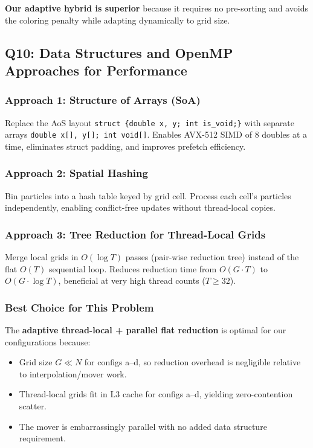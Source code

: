 \documentclass[12pt,a4paper]{article}
\begin{document}
\textbf{Our adaptive hybrid is superior} because it requires no pre-sorting and avoids
the coloring penalty while adapting dynamically to grid size.

\subsection{Q10: Data Structures and OpenMP Approaches for Performance}

\subsubsection{Approach 1: Structure of Arrays (SoA)}
Replace the AoS layout \texttt{struct \{double x, y; int is\_void;\}} with separate
arrays \texttt{double x[], y[]; int void[]}. Enables AVX-512 SIMD of 8 doubles at a
time, eliminates struct padding, and improves prefetch efficiency.

\subsubsection{Approach 2: Spatial Hashing}
Bin particles into a hash table keyed by grid cell. Process each cell's particles
independently, enabling conflict-free updates without thread-local copies.

\subsubsection{Approach 3: Tree Reduction for Thread-Local Grids}
Merge local grids in $O(\log T)$ passes (pair-wise reduction tree) instead of the flat
$O(T)$ sequential loop. Reduces reduction time from $O(G \cdot T)$ to
$O(G \cdot \log T)$, beneficial at very high thread counts ($T \geq 32$).

\subsubsection{Best Choice for This Problem}
The \textbf{adaptive thread-local + parallel flat reduction} is optimal for our
configurations because:
\begin{itemize}
    \item Grid size $G \ll N$ for configs a--d, so reduction overhead is negligible
          relative to interpolation/mover work.
    \item Thread-local grids fit in L3 cache for configs a--d, yielding zero-contention
          scatter.
    \item The mover is embarrassingly parallel with no added data structure requirement.
\end{itemize}
\end{document}
